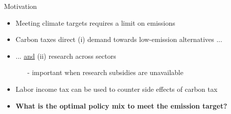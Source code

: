 \documentclass[11pt,aspectratio=169]{beamer}
\newcommand{\ar}{$\Rightarrow$ \ }
\begin{document}
	\begin{frame}{Motivation}
		
		\begin{itemize}[<+-| alert@+>]
			\item Meeting climate targets requires a limit on emissions \citep{IPCC2022}
			\vspace{3mm}
			\item Carbon taxes  direct  (i) demand towards low-emission alternatives ...
			\vspace{3mm}
			\item ... \underline{and} (ii) research across sectors
			\vspace{2mm}
			\begin{itemize}
				\item[-] important when research subsidies are unavailable \small{\citep{Acemoglu2012TheChange}}	
			\end{itemize}
			\vspace{2mm}
			\item Labor income tax can be used to counter side effects of carbon tax 
			
			\vspace{3mm}
			\item \textbf{What is the optimal policy mix to meet the emission target?}
		\end{itemize}
	\end{frame}
	
\end{document}

